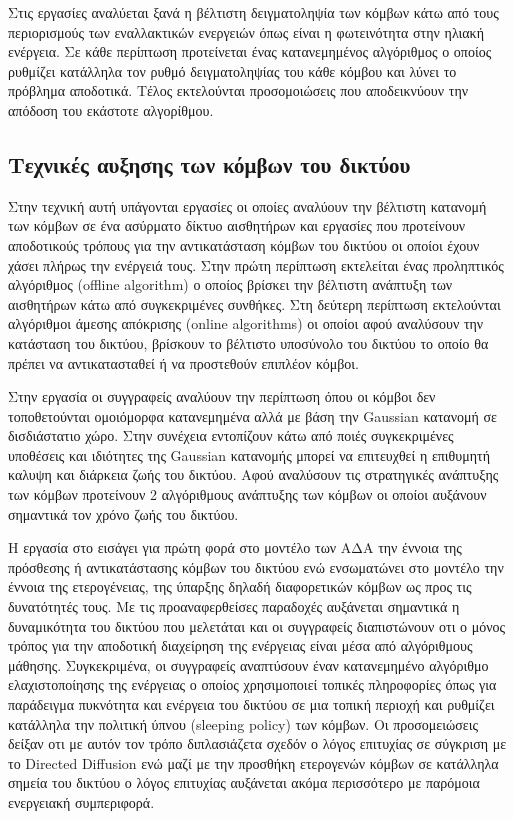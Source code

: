 Στις εργασίες \cite{harvesting_8} \cite{harvesting_9} αναλύεται ξανά η βέλτιστη δειγματοληψία των κόμβων κάτω από τους περιορισμούς των εναλλακτικών ενεργειών όπως
είναι η φωτεινότητα στην ηλιακή ενέργεια. Σε κάθε περίπτωση προτείνεται ένας κατανεμημένος αλγόριθμος ο οποίος ρυθμίζει κατάλληλα τον ρυθμό δειγματοληψίας του κάθε
κόμβου και λύνει το πρόβλημα αποδοτικά. Τέλος εκτελούνται προσομοιώσεις που αποδεικνύουν την απόδοση του εκάστοτε αλγορίθμου.



\subsection{Τεχνικές αυξησης των κόμβων του δικτύου}
Στην τεχνική αυτή υπάγονται εργασίες οι οποίες αναλύουν την βέλτιστη κατανομή των κόμβων σε ένα ασύρματο δίκτυο αισθητήρων και εργασίες που προτείνουν αποδοτικούς
τρόπους για την αντικατάσταση κόμβων του δικτύου οι οποίοι έχουν χάσει πλήρως την ενέργειά τους. Στην πρώτη περίπτωση εκτελείται ένας προληπτικός αλγόριθμος (offline
algorithm) ο οποίος βρίσκει την βέλτιστη ανάπτυξη των αισθητήρων κάτω από συγκεκριμένες συνθήκες. Στη δεύτερη περίπτωση εκτελούνται αλγόριθμοι άμεσης
απόκρισης (online algorithms) οι οποίοι αφού αναλύσουν την κατάσταση του δικτύου, βρίσκουν το βέλτιστο υποσύνολο του δικτύου το οποίο θα πρέπει να αντικατασταθεί ή
να προστεθούν επιπλέον κόμβοι.

Στην εργασία \cite{gaussian_sensors} οι συγγραφείς αναλύουν την περίπτωση όπου οι κόμβοι δεν τοποθετούνται ομοιόμορφα κατανεμημένα αλλά με βάση την Gaussian κατανομή
σε δισδιάστατιο χώρο. Στην συνέχεια εντοπίζουν κάτω από ποιές συγκεκριμένες υποθέσεις και ιδιότητες της Gaussian κατανομής μπορεί να επιτευχθεί η επιθυμητή καλυψη και
διάρκεια ζωής του δικτύου. Αφού αναλύσουν τις στρατηγικές ανάπτυξης των κόμβων προτείνουν 2 αλγόριθμους ανάπτυξης των κόμβων οι οποίοι αυξάνουν σημαντικά τον χρόνο
ζωής του δικτύου.

Η εργασία στο \cite{sens_deployment3} εισάγει για πρώτη φορά στο μοντέλο των ΑΔΑ την έννοια της πρόσθεσης ή αντικατάστασης κόμβων του δικτύου ενώ ενσωματώνει στο
μοντέλο την έννοια της ετερογένειας, της ύπαρξης δηλαδή διαφορετικών κόμβων ως προς τις δυνατότητές τους. Με τις προαναφερθείσες παραδοχές αυξάνεται σημαντικά η
δυναμικότητα του δικτύου που μελετάται και οι συγγραφείς διαπιστώνουν οτι ο μόνος τρόπος για την αποδοτική διαχείρηση της ενέργειας είναι μέσα από αλγόριθμους
μάθησης. Συγκεκριμένα, οι συγγραφείς αναπτύσουν έναν κατανεμημένο αλγόριθμο ελαχιστοποίησης της ενέργειας ο οποίος χρησιμοποιεί τοπικές πληροφορίες όπως για
παράδειγμα πυκνότητα και ενέργεια του δικτύου σε μια τοπική περιοχή και ρυθμίζει κατάλληλα την πολιτική ύπνου (sleeping policy) των κόμβων. Οι προσομειώσεις δείξαν
οτι με αυτόν τον τρόπο διπλασιάζετα σχεδόν ο λόγος επιτυχίας σε σύγκριση με το Directed Diffusion ενώ μαζί με την προσθήκη ετερογενών κόμβων σε κατάλληλα σημεία του
δικτύου ο λόγος επιτυχίας αυξάνεται ακόμα περισσότερο με παρόμοια ενεργειακή συμπεριφορά.

